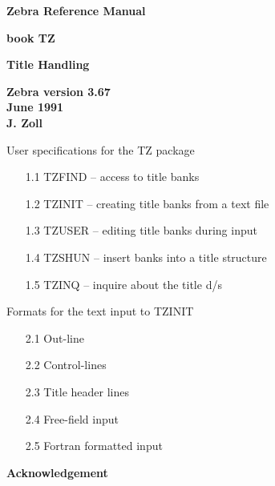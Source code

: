 \thispagestyle{empty}     %
\vspace*{-20mm}
\begin{center} {\large\bf Zebra Reference Manual} \vspace{8mm} \end{center}
\begin{center} {\LARGE\bf book TZ} \vspace{2mm} \end{center}
\begin{center} {\Large\bf Title Handling} \vspace{4mm} \end{center}
\begin{center}
  {\large\bf Zebra version 3.67 \vspace{2mm} \\
             June 1991          \vspace{2mm} \\
             J. Zoll}
\end{center}
\vspace*{20pt}
\begin{description}
  \in{30mm}
  \item[Chapter 1] User specifications for the TZ package
  \begin{itemize}
     \in{30mm}
     \item[1.1] TZFIND -- access to title banks
     \item[1.2] TZINIT -- creating title banks from a text file
     \item[1.3] TZUSER -- editing title banks during input
     \item[1.4] TZSHUN -- insert banks into a title structure
     \item[1.5] TZINQ  -- inquire about the title d/s
  \end{itemize}
  \item[Chapter 2] Formats for the text input to TZINIT
  \begin{itemize}
     \in{30mm}
     \item[2.1] Out-line
     \item[2.2] Control-lines
     \item[2.3] Title header lines
     \item[2.4] Free-field input
     \item[2.5] Fortran formatted input
  \end{itemize}
\end{description}
\newpage
\vspace*{40pt}
{\large\bf Acknowledgement} \vspace{4mm}

